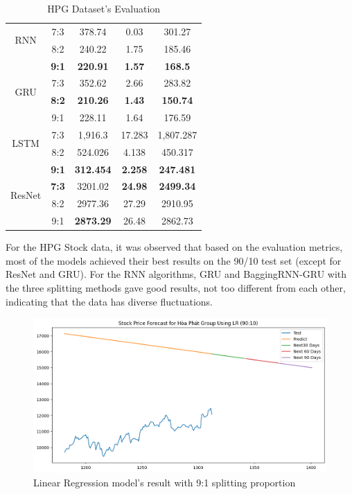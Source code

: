 \documentclass{ieeeojies}
\begin{document}
\begin{table}[H]
\begin{tabular}{|c|c|c|c|c|}
         \multirow{2}{*}{RNN} & 7:3	& 378.74 & 0.03 & 301.27 \\ & 8:2 & 240.22 & 1.75 & 185.46 \\ & \textbf{9:1} & \textbf{220.91} & \textbf{1.57} & \textbf{168.5}\\
         \hline
         \multirow{2}{*}{GRU} & 7:3 & 352.62&2.66 & 283.82 \\ & \textbf{8:2} &	\textbf{210.26} & \textbf{1.43} & \textbf{150.74} \\ & 9:1 &228.11	&1.64&176.59\\
         \hline
         \multirow{2}{*}{LSTM} & 7:3 & 1,916.3 & 17.283 & 1,807.287 \\ & 8:2 & 524.026 & 4.138  & 450.317 \\ & \textbf{9:1} &  	\textbf{312.454} &	\textbf{2.258} &\textbf{247.481} \\
         \hline
         \multirow{2}{*}{ResNet} & \textbf{7:3} & 3201.02 & \textbf{24.98} & \textbf{2499.34} \\ & 8:2 & 2977.36 &  27.29 &  2910.95 \\ & 9:1 & \textbf{2873.29} &  26.48 &  2862.73 \\
         \hline
    \end{tabular}
    \caption{HPG Dataset's Evaluation}
    \label{vcbresult}
\end{table}
For the HPG Stock data, it was observed that based on the evaluation metrics, most of the models achieved their best results on the 90/10 test set (except for ResNet and GRU). For the RNN algorithms, GRU and BaggingRNN-GRU with the three splitting methods gave good results, not too different from each other, indicating that the data has diverse fluctuations.
\begin{figure}[H]
  \centering
  \begin{minipage}{0.8\linewidth}
    \centering
    \includegraphics[width=\linewidth]{bibliography/LN_HPG_90-10.png}
    \caption{Linear Regression model's result with 9:1 splitting proportion}
    \label{fig8}
  \end{minipage}
\end{figure}
\end{document}
